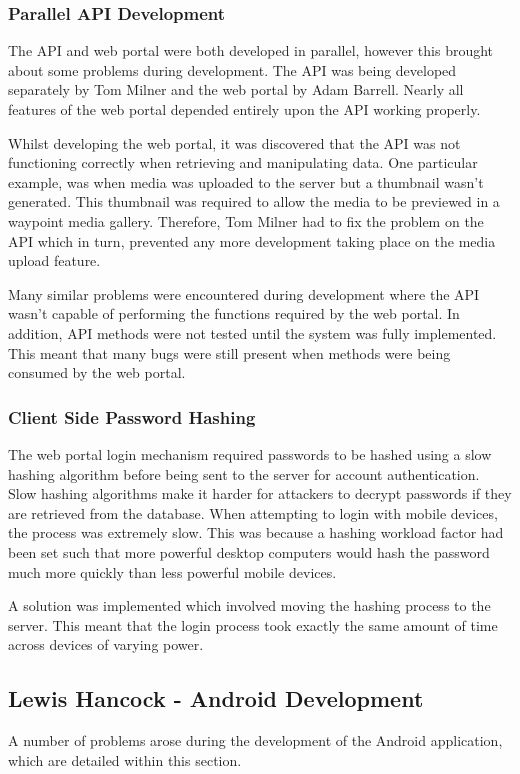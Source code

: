 \documentclass[11pt,a4paper]{report}
\begin{document}
\subsubsection{Parallel API Development}
The API and web portal were both developed in parallel, however this brought about some problems during development. The API was being developed separately by Tom Milner and the web portal by Adam Barrell. Nearly all features of the web portal depended entirely upon the API working properly.

Whilst developing the web portal, it was discovered that the API was not functioning correctly when retrieving and manipulating data. One particular example, was when media was uploaded to the server but a thumbnail wasn't generated. This thumbnail was required to allow the media to be previewed in a waypoint media gallery. Therefore, Tom Milner had to fix the problem on the API which in turn, prevented any more development taking place on the media upload feature.

Many similar problems were encountered during development where the API wasn't capable of performing the functions required by the web portal. In addition, API methods were not tested until the system was fully implemented. This meant that many bugs were still present when methods were being consumed by the web portal.

\subsubsection{Client Side Password Hashing}
The web portal login mechanism required passwords to be hashed using a slow hashing algorithm before being sent to the server for account authentication. Slow hashing algorithms make it harder for attackers to decrypt passwords if they are retrieved from the database. When attempting to login with mobile devices, the process was extremely slow. This was because a hashing workload factor had been set such that more powerful desktop computers would hash the password much more quickly than less powerful mobile devices.

A solution was implemented which involved moving the hashing process to the server. This meant that the login process took exactly the same amount of time across devices of varying power.

\subsection{Lewis Hancock - Android Development}
A number of problems arose during the development of the Android application, which are detailed within this section.
\end{document}
